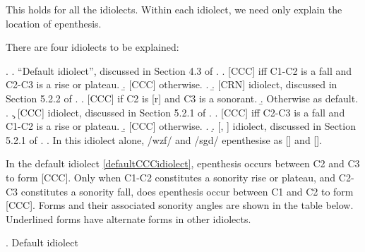 \documentclass[12pt]{article}
\begin{document}
This holds for all the idiolects. Within each idiolect, we need only explain the location of epenthesis.

There are four idiolects to be explained:

\ex. \a. ``Default idiolect'', discussed in Section 4.3 of \citep{rose.2000}. \label{defaultCCCidiolect}
           \a. [CCC] iff C1-C2 is a fall and C2-C3 is a rise or plateau.
           \b. [CCC] otherwise.
           \z.
     \b. [CRN] idiolect, discussed in Section 5.2.2 of \citep{rose.2000}. \label{CRNidiolect}
           \a. [CCC] if C2 is [r] and C3 is a sonorant.
           \b. Otherwise as default.
           \z.
     \c. [CCC] idiolect, discussed in Section 5.2.1 of \citep{rose.2000}. \label{C1CCidiolect}
           \a. [CCC] iff C2-C3 is a fall and C1-C2 is a rise or plateau.
           \b. [CCC] otherwise.
           \z.
     \d. [, ] idiolect, discussed in Section 5.2.1 of \citep{rose.2000}. \label{wizfidiolect}
          \a. In this idiolect alone, /wzf/ and /sgd/ epenthesise as [] and  [].

\bigskip

 In the default idiolect \ref{defaultCCCidiolect}, epenthesis occurs between C2 and C3 to form [CCC].
Only when C1-C2 constitutes a sonority rise or plateau, and C2-C3 constitutes a sonority fall, does epenthesis occur between C1 and C2 to form [CCC]. Forms and their associated sonority angles are shown in the table below. Underlined forms have alternate forms in other idiolects.

\ex. Default idiolect
\end{document}
